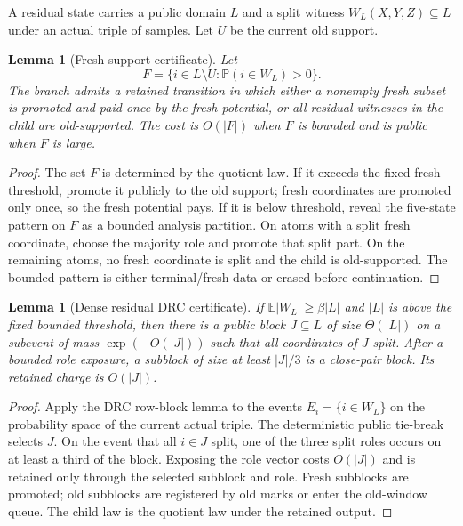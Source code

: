 \documentclass[11pt]{article}
\newtheorem{lemma}[theorem]{Lemma}
\theoremstyle{remark}
\newcommand{\E}{\mathbb E}
\newcommand{\Prob}{\mathbb P}
\begin{document}
A residual state carries a public domain $L$ and a split witness $W_L(X,Y,Z)\subseteq L$ under an actual triple of samples.  Let $U$ be the current old support.

\begin{lemma}[Fresh support certificate]\label{lem:app-fresh}
Let
\[
        F=\{i\in L\setminus U:\Prob(i\in W_L)>0\}.
\]
The branch admits a retained transition in which either a nonempty fresh subset is promoted and paid once by the fresh potential, or all residual witnesses in the child are old-supported.  The cost is $O(|F|)$ when $F$ is bounded and is public when $F$ is large.
\end{lemma}

\begin{proof}
The set $F$ is determined by the quotient law.  If it exceeds the fixed fresh threshold, promote it publicly to the old support; fresh coordinates are promoted only once, so the fresh potential pays.  If it is below threshold, reveal the five-state pattern on $F$ as a bounded analysis partition.  On atoms with a split fresh coordinate, choose the majority role and promote that split part.  On the remaining atoms, no fresh coordinate is split and the child is old-supported.  The bounded pattern is either terminal/fresh data or erased before continuation.
\end{proof}

\begin{lemma}[Dense residual DRC certificate]\label{lem:app-dense}
If $\E|W_L|\ge \beta |L|$ and $|L|$ is above the fixed bounded threshold, then there is a public block $J\subseteq L$ of size $\Theta(|L|)$ on a subevent of mass $\exp(-O(|J|))$ such that all coordinates of $J$ split.  After a bounded role exposure, a subblock of size at least $|J|/3$ is a close-pair block.  Its retained charge is $O(|J|)$.
\end{lemma}

\begin{proof}
Apply the DRC row-block lemma to the events $E_i=\{i\in W_L\}$ on the probability space of the current actual triple.  The deterministic public tie-break selects $J$.  On the event that all $i\in J$ split, one of the three split roles occurs on at least a third of the block.  Exposing the role vector costs $O(|J|)$ and is retained only through the selected subblock and role.  Fresh subblocks are promoted; old subblocks are registered by old marks or enter the old-window queue.  The child law is the quotient law under the retained output.
\end{proof}
\end{document}

